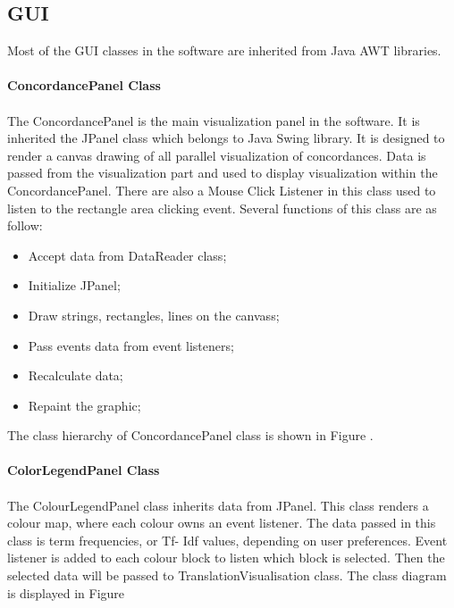 \subsection{GUI}
Most of the GUI classes in the software are inherited from Java AWT libraries. 
\paragraph{ConcordancePanel Class}
\paragraph[]{}The ConcordancePanel is the main visualization panel in the software. It is inherited the JPanel class which belongs to Java Swing library. It is designed to render a canvas drawing of all parallel visualization of concordances. Data is passed from the visualization part and used to display visualization within the ConcordancePanel. There are also a Mouse Click Listener in this class used to listen to the rectangle area clicking event. Several functions of this class are as follow:
\begin{itemize}
	\item \textbf{}Accept data from DataReader class;
	\item \textbf{}Initialize JPanel;
	\item \textbf{}Draw strings, rectangles, lines on the canvass;
	\item \textbf{}Pass events data from event listeners;
	\item \textbf{}Recalculate data;
	\item \textbf{}Repaint the graphic;
\end{itemize}  
The class hierarchy of ConcordancePanel class is shown in Figure \label{concordancePanel}. 

\paragraph{ColorLegendPanel Class}
\paragraph[]{}The ColourLegendPanel class inherits data from JPanel. This class renders a colour map, where each colour owns an event listener. The data passed in this class is term frequencies, or Tf- Idf values, depending on user preferences. Event listener is added to each colour block to listen which block is selected. Then the selected data will be passed to TranslationVisualisation class. The class diagram is displayed in Figure \label{colourLegendPanel}

